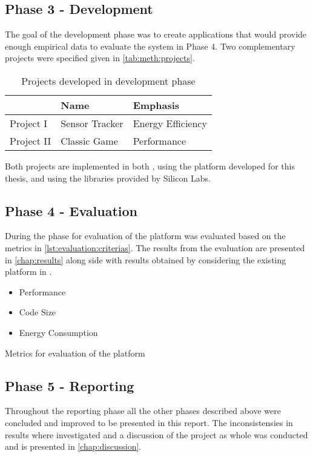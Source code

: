 \subsection{Phase 3 - Development}
\label{sec:projects}

The goal of the development phase was to create applications that would provide enough empirical data to evaluate the system in Phase 4.
Two complementary projects were specified given in \autoref{tab:meth:projects}.

\begin{table}[H]
  \centering
  \begin{tabular}{l|l|l}
    & \textbf{Name} & \textbf{Emphasis} \\
    \hline
    Project I & Sensor Tracker & Energy Efficiency \\
    Project II & Classic Game & Performance \\
    \hline
  \end{tabular}
  \caption{Projects developed in development phase}
  \label{tab:meth:projects}
\end{table}

Both projects are implemented in both {\rust}, using the platform developed for this thesis, and {\C} using the libraries provided by Silicon Labs.

\subsection{Phase 4 - Evaluation}
During the phase for evaluation of the platform was evaluated based on the metrics in \autoref{lst:evaluation:criterias}.
The results from the evaluation are presented in \autoref{chap:results} along side with results obtained by considering the existing platform in {\C}.

\begin{listing}
  \begin{itemize}
  \item Performance
  \item Code Size
  \item Energy Consumption
  \end{itemize}
  \caption{Metrics for evaluation of the platform}
  \label{lst:evaluation:criterias}
\end{listing}

\subsection{Phase 5 - Reporting}

Throughout the reporting phase all the other phases described above were concluded and improved to be presented in this report.
The inconsistensies in results where investigated and a discussion of the project as whole was conducted and is presented in \autoref{chap:discussion}.
